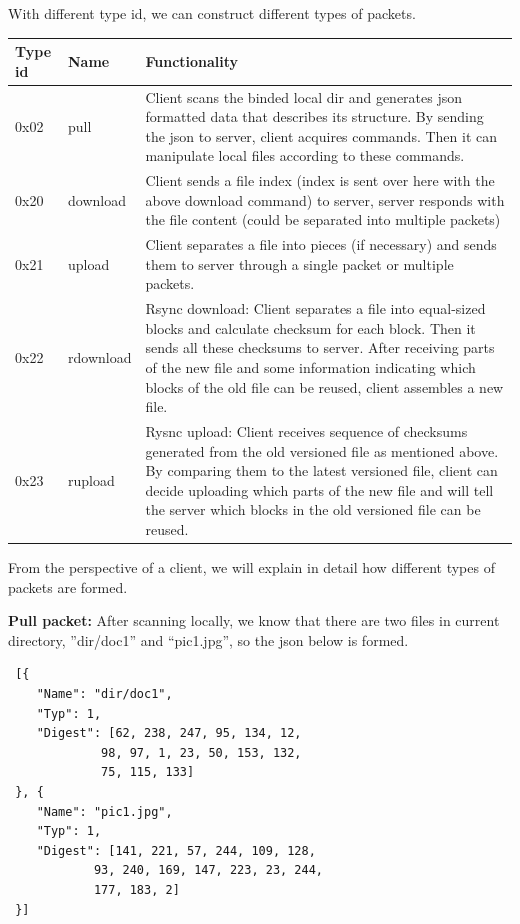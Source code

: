 \documentclass{article}
\begin{document}
 With different type id, we can construct different types of packets.

 \begin{center}
 \begin{tabular}{ | m{2cm}  | m{2cm} | m{7cm} | }
 \hline
 \textbf{Type id} & \textbf{Name} & \textbf{Functionality} \\
 \hline
 0x02 & pull & Client scans the binded local dir and generates json formatted data that describes its structure. By sending the json to server, client acquires commands. Then it can manipulate local files according to these commands. \\
 \hline
 0x20 & download & Client sends a file index (index is sent over here with the above download command) to server, server responds with the file content (could be separated into multiple packets) \\
 \hline
 0x21 & upload & Client separates a file into pieces (if necessary) and sends them to server through a single packet or multiple packets. \\
 \hline
 0x22 & rdownload & Rsync download: Client separates a file into equal-sized blocks and calculate checksum for each block. Then it sends all these checksums to server. After receiving parts of the new file and some information indicating which blocks of the old file can be reused, client assembles a new file.
 \\
 \hline
 0x23 & rupload & Rysnc upload: Client receives sequence of checksums generated from the old versioned file as mentioned above. By comparing them to the latest versioned file, client can decide uploading which parts of the new file and will tell the server which blocks in the old versioned file can be reused. \\
 \hline
 \end{tabular}
 \end{center}

 From the perspective of a client, we will explain in detail how different types of packets are formed.
 \newline
 \hfill \break

\textbf{Pull packet:} After scanning locally, we know that there are two files in current directory, ”dir/doc1” and “pic1.jpg”, so the json below is formed.
 \begin{lstlisting}
 [{
 	"Name": "dir/doc1",
 	"Typ": 1,
 	"Digest": [62, 238, 247, 95, 134, 12,
             98, 97, 1, 23, 50, 153, 132,
             75, 115, 133]
 }, {
 	"Name": "pic1.jpg",
 	"Typ": 1,
 	"Digest": [141, 221, 57, 244, 109, 128,
            93, 240, 169, 147, 223, 23, 244,
            177, 183, 2]
 }]

 \end{lstlisting}
\end{document}
